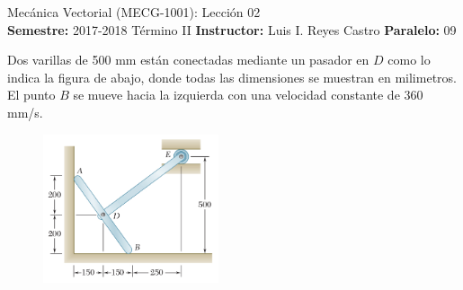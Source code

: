 \documentclass[ a4paper, twoside, 11pt]{article}
\newcommand{\numero}{02}
\begin{document}
\allowdisplaybreaks

\begin{center}
\Large Mec\'anica Vectorial (MECG-1001): Lecci\'on \numero \\[2ex]
\small \textbf{Semestre:} 2017-2018 T\'ermino II \qquad
\textbf{Instructor:} Luis I. Reyes Castro \qquad
\textbf{Paralelo:} 09
\end{center}
\fullskip

\begin{problem} Dos varillas de 500 mm est\'an conectadas mediante un pasador en $D$ como lo indica la figura de abajo, donde todas las dimensiones se muestran en milimetros. El punto $B$ se mueve hacia la izquierda con una velocidad constante de 360 mm/s. 

\begin{figure}[htb]
\centering
\includegraphics[width=0.46\textwidth]{problema-01.jpg}
\end{figure}


\end{problem}
\end{document}
